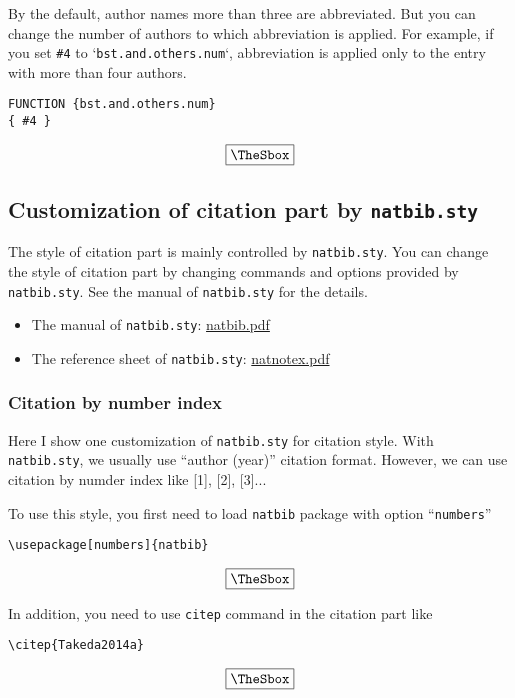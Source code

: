 \documentclass[10pt]{article}
\newenvironment{Frame}%
{\setlength{\fboxsep}{15pt}
\setlength{\mylength}{\linewidth}%
\addtolength{\mylength}{-2\fboxsep}%
\addtolength{\mylength}{-2\fboxrule}%
\Sbox
\minipage{\mylength}%
\setlength{\abovedisplayskip}{0pt}%
\setlength{\belowdisplayskip}{0pt}%
}%
{\endminipage\endSbox
\[\fbox{\TheSbox}\]}
\begin{document}
By the default, author names more than three are abbreviated. But you can change
the number of authors to which abbreviation is applied.  For example, if you set
\verb|#4| to `\texttt{bst.and.others.num}`, abbreviation is applied only to the
entry with more than four authors.
\begin{Frame}
\begin{verbatim}
FUNCTION {bst.and.others.num}
{ #4 }
\end{verbatim} 
\end{Frame}

\subsection{Customization of citation part by \texttt{natbib.sty}}

The style of citation part is mainly controlled by \texttt{natbib.sty}. You can
change the style of citation part by changing commands and options provided by
\texttt{natbib.sty}.
See the manual of \texttt{natbib.sty} for the details. 
\begin{itemize}
 \item The manual of \texttt{natbib.sty}:
       \href{http://ctan.math.utah.edu/ctan/tex-archive/macros/latex/contrib/natbib/natbib.pdf}{natbib.pdf}
 \item The reference sheet of \texttt{natbib.sty}:
       \href{http://mirror.las.iastate.edu/tex-archive/macros/latex/contrib/natbib/natnotes.pdf}{natnotex.pdf}
\end{itemize}

\subsubsection{Citation by number index}

Here I show one customization of \texttt{natbib.sty} for citation style.  With
\texttt{natbib.sty}, we usually use ``author (year)'' citation format. However,
we can use citation by numder index like [1], [2], [3]...

To use this style, you first need to load \texttt{natbib} package with option
``\texttt{numbers}''
\begin{Frame}
\begin{verbatim}
\usepackage[numbers]{natbib}        
\end{verbatim} 
\end{Frame}

In addition, you need to use \texttt{citep} command in the citation part like
\begin{Frame}
\begin{verbatim}
\citep{Takeda2014a}
\end{verbatim} 
\end{Frame}
\end{document}
